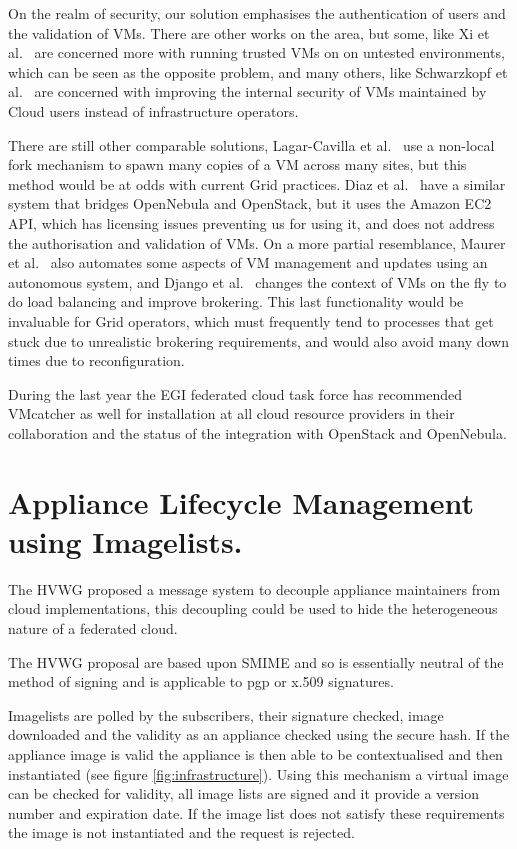 \documentclass{llncs_Ibergrid2013}
\begin{document}
On the realm of security, our solution emphasises the authentication of users and the validation of VMs. There are other works on the area, but some, like Xi et al.~\cite{Xi2012} are concerned more with running trusted VMs on on untested environments, which can be seen as the opposite problem, and many others, like Schwarzkopf et al.~\cite{Schwarzkopf2012} are concerned with improving the internal security of VMs maintained by Cloud users instead of infrastructure operators.

There are still other comparable solutions, Lagar-Cavilla et al.~\cite{Lagar-Cavilla2009} use a non-local fork mechanism to spawn many copies of a VM across many sites, but this method would be at odds with current Grid practices. Diaz et al.~\cite{Diaz2012} have a similar system that bridges OpenNebula and OpenStack, but it uses the Amazon EC2 API, which has licensing issues preventing us for using it, and does not address the authorisation and validation of VMs. On a more partial resemblance, Maurer et al.~\cite{Maurer2013} also automates some aspects of VM management and updates using an autonomous system, and Django et al.~\cite{Django2013} changes the context of VMs on the fly to do load balancing and improve brokering. This last functionality would be invaluable for Grid operators, which must frequently tend to processes that get stuck due to unrealistic brokering requirements, and would also avoid many down times due to reconfiguration.


During the last year the EGI federated cloud task force has recommended VMcatcher as well for installation at all cloud resource providers in their collaboration and the status of the integration with OpenStack and OpenNebula.


\section{Appliance Lifecycle Management using Imagelists.}
\label{sect-appliancelifecycle}

The HVWG proposed a message system to decouple appliance maintainers from cloud implementations, this decoupling could be used to hide the heterogeneous nature of a federated cloud.

The HVWG proposal are based upon SMIME and so is essentially neutral of the method of signing and is applicable to pgp or x.509 signatures.

Imagelists are polled by the subscribers, their signature checked, image downloaded and the validity as an appliance checked using the secure hash. If the appliance image is valid the appliance is then able to be contextualised and then instantiated (see figure \ref{fig:infrastructure}). 
Using this mechanism a virtual image can be checked for validity, all image lists are signed and it provide a version number and expiration date. If the image list does not satisfy these requirements the image is not instantiated and the request is rejected.
\end{document}
